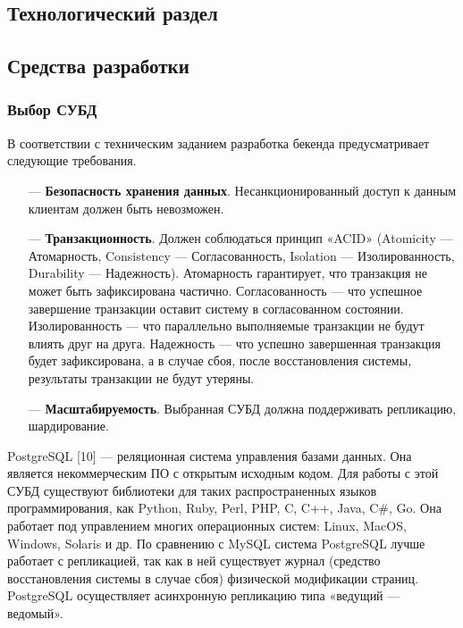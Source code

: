 \documentclass[a4paper, 12pt]{article}
\begin{document}
\begin{large}
\newpage

\section{Технологический раздел}
\subsection{Средства разработки}
\subsubsection{Выбор СУБД}

В  соответствии  с  техническим  заданием  разработка  бекенда предусматривает следующие требования.
\begin{itemize}
	\item[---] \textbf{Безопасность  хранения  данных}.  Несанкционированный  доступ к данным клиентам должен быть невозможен.
	
	\item[---] \textbf{Транзакционность}.  Должен  соблюдаться  принцип  «ACID» (Atomicity  —  Атомарность,  Consistency  —  Согласованность, Isolation — Изолированность, Durability — Надежность). Атомарность гарантирует, что транзакция не может быть зафиксирована частично.  Согласованность  —  что  успешное  завершение  транзакции оставит  систему  в  согласованном состоянии. Изолированность  —  что  параллельно  выполняемые  транзакции  не  будут влиять друг на друга. Надежность — что успешно завершенная транзакция  будет  зафиксирована,  а  в случае  сбоя, после восстановления системы, результаты транзакции не будут утеряны.
	
	\item[---] \textbf{Масштабируемость}.  Выбранная  СУБД  должна  поддерживать репликацию, шардирование.
\end{itemize}

PostgreSQL [10] --- реляционная система управления базами данных. 
Она является некоммерческим ПО с открытым исходным кодом. 
Для работы с этой СУБД существуют библиотеки для таких распространенных языков программирования, как Python, Ruby, Perl, PHP, C, C++, Java, C\#, Go. 
Она работает под управлением многих операционных систем: Linux, MacOS, Windows, Solaris и др. 
По сравнению с MySQL система PostgreSQL лучше работает с репликацией, так как в ней существует журнал (средство восстановления системы в случае сбоя) физической модификации страниц. 
PostgreSQL осуществляет асинхронную репликацию типа «ведущий — ведомый».


\end{large}
\end{document}
